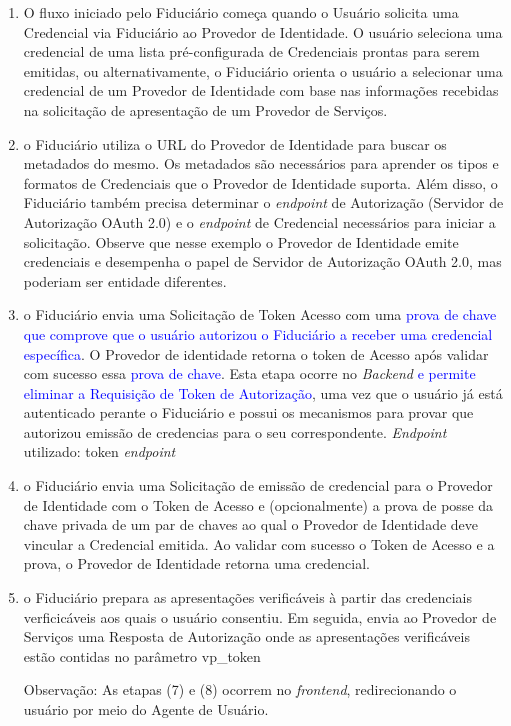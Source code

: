 \begin{enumerate}
    \item O fluxo iniciado pelo Fiduciário começa quando o Usuário solicita uma Credencial via Fiduciário ao Provedor de Identidade. O usuário seleciona uma credencial de uma lista pré-configurada de Credenciais prontas para serem emitidas, ou alternativamente, o Fiduciário orienta o usuário a selecionar uma credencial de um Provedor de Identidade com base nas informações recebidas na solicitação de apresentação de um Provedor de Serviços.

    \item o Fiduciário utiliza o URL do Provedor de Identidade para buscar os metadados do mesmo. Os metadados são necessários para aprender os tipos e formatos de Credenciais que o Provedor de Identidade suporta. Além disso, o Fiduciário também precisa determinar o \textit{endpoint} de Autorização (Servidor de Autorização OAuth 2.0) e o \textit{endpoint} de Credencial necessários para iniciar a solicitação. Observe que nesse exemplo o Provedor de Identidade emite credenciais e desempenha o papel de Servidor de Autorização OAuth 2.0, mas poderiam ser entidade diferentes.

    \item o Fiduciário envia uma Solicitação de Token Acesso com uma \textcolor{blue}{prova de chave que comprove que o usuário autorizou o Fiduciário a receber uma credencial específica}. O Provedor de identidade retorna o token de Acesso após validar com sucesso essa \textcolor{blue}{prova de chave}. Esta etapa ocorre no \textit{Backend} \textcolor{blue}{e permite eliminar a Requisição de Token de Autorização}, uma vez que o usuário já está autenticado perante o Fiduciário e possui os mecanismos para provar que autorizou emissão de credencias para o seu correspondente. \textit{Endpoint} utilizado: token \textit{endpoint}

    \item o Fiduciário envia uma Solicitação de emissão de credencial para o Provedor de Identidade com o Token de Acesso e (opcionalmente) a prova de posse da chave privada de um par de chaves ao qual o Provedor de Identidade deve vincular a Credencial emitida. Ao validar com sucesso o Token de Acesso e a prova, o Provedor de Identidade retorna uma credencial.
    
    \item o Fiduciário prepara as apresentações verificáveis à partir das credenciais verficicáveis aos quais o usuário consentiu. Em seguida, envia ao Provedor de Serviços uma Resposta de Autorização onde as apresentações verificáveis estão contidas no parâmetro vp\_token
    
    Observação: As etapas (7) e (8) ocorrem no \textit{frontend}, redirecionando o usuário por meio do Agente de Usuário.

\end{enumerate}